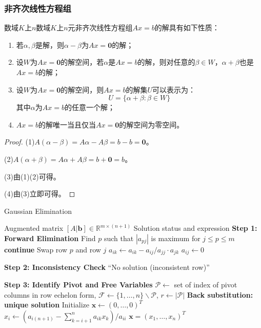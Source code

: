 \subsubsection{非齐次线性方程组}
\begin{property}\label{prop:InhomogeneousSLESolution}
	数域$K$上$n$数域$K$上$n$元非齐次线性方程组$Ax=b$的解具有如下性质：
	\begin{enumerate}
		\item 若$\alpha,\beta$是解，则$\alpha-\beta$为$Ax=\mathbf{0}$的解；
		\item 设$W$为$Ax=\mathbf{0}$的解空间，若$\alpha$是$Ax=b$的解，则对任意的$\beta\in W$，$\alpha+\beta$也是$Ax=b$的解；
		\item 设$W$为$Ax=\mathbf{0}$的解空间，则$Ax=b$的解集$U$可以表示为：
		\begin{equation*}
			U=\{\alpha+\beta:\beta\in W\}
		\end{equation*}
		其中$\alpha$为$Ax=b$的任意一个解；
		\item $Ax=b$的解唯一当且仅当$Ax=\mathbf{0}$的解空间为零空间。
	\end{enumerate}
\end{property}
\begin{proof}
	(1)$A(\alpha-\beta)=A\alpha-A\beta=b-b=\mathbf{0}$。\par
	(2)$A(\alpha+\beta)=A\alpha+A\beta=b+\mathbf{0}=b$。\par
	(3)由(1)(2)可得。\par
	(4)由(3)立即可得。
\end{proof}
\begin{algorithm}
	\caption{Gaussian Elimination}
	\label{alg:gauss}
	\begin{algorithmic}[1]
		\Require Augmented matrix $[A|\mathbf{b}] \in \mathbb{R}^{m \times (n+1)}$
		\Ensure Solution status and expression
		\State \textbf{Step 1: Forward Elimination}
		\State Find $p$ such that $|a_{pj}|$ is maximum for $j \leq p \leq m$ 
		\State \textbf{continue} 
		\EndIf
		\State Swap row $p$ and row $j$
		\State $a_{ik} \gets a_{ik} - a_{ij} / a_{jj} \cdot a_{jk}$
		\EndFor
		\State $a_{ij} \gets 0$ 
		\EndFor
		\EndFor
		
		\State \textbf{Step 2: Inconsistency Check}
		\State \Return ``No solution (inconsistent row)''
		\EndIf
		\EndFor
		
		\State \textbf{Step 3: Identify Pivot and Free Variables}
		\State $\mathcal{P} \gets$ set of index of pivot columns in row echelon form, $\mathcal{F} \gets \{1,\dots,n\}\backslash\mathcal{P}$, $r \gets |\mathcal{P}|$
		\State \textbf{Back substitution: unique solution}
		\State Initialize $\mathbf{x} \gets (0,\dots,0)^T$
		\State $x_i \gets \left(a_{i(n+1)} - \sum\limits_{k=i+1}^{n} a_{ik} x_k\right) / a_{ii}$
		\EndFor
		\State \Return $\mathbf{x} = (x_1,\dots,x_n)^T$
		\EndIf
	\end{algorithmic}
\end{algorithm}
